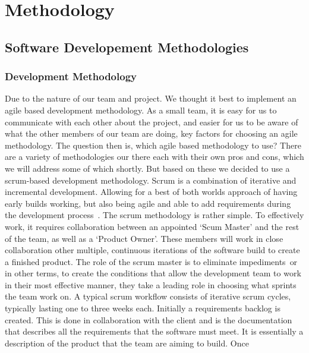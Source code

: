 \chapter{Methodology} \label{ch:methodology}
    \section{Software Developement Methodologies}
        \subsection{Development Methodology}
            Due to the nature of our team and project. We thought it best to implement an agile based development
            methodology. As a small team, it is easy for us to communicate with each other about the project, and easier
            for us to be aware of what the other members of our team are doing, key factors for choosing an agile
            methodology. The question then is, which agile based methodology to use? There are a variety of
            methodologies our there each with their own pros and cons, which we will address some of which shortly. But
            based on these we decided to use a scrum-based development methodology. Scrum is a combination of iterative
            and incremental development. Allowing for a best of both worlds approach of having early builds working, but
            also being agile and able to add requirements during the development process~\cite{srivastava_2017_scrum}.
            The scrum methodology is rather simple. To effectively work, it requires collaboration between an appointed
            ‘Scum Master’ and the rest of the team, as well as a ‘Product Owner’. These members will work in close
            collaboration other multiple, continuous iterations of the software build to create a finished product. The
            role of the scrum master is to eliminate impediments~\cite{srivastava_2017_scrum}or in other terms, to
            create the conditions that allow the development team to work in their most effective manner, they take a
            leading role in choosing what sprints the team work on. A typical scrum workflow consists of iterative scrum
            cycles, typically lasting one to three weeks each. Initially a requirements backlog is created.  This is
            done in collaboration with the client and is the documentation that describes all the requirements that the
            software must meet. It is essentially a description of the product that the team are aiming to build. Once
